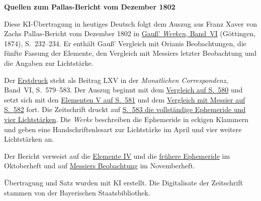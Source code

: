 \clearpage\thispagestyle{empty}
\begin{center}\textbf{Quellen zum Pallas-Bericht vom Dezember 1802}\end{center}
\noindent Diese KI-Übertragung in heutiges Deutsch folgt dem Auszug aus Franz Xaver von Zachs Pallas-Bericht vom Dezember 1802 in \href{https://gdz.sub.uni-goettingen.de/id/PPN236007467}{Gauß’ \textit{Werken}, Band~VI} (Göttingen, 1874), S.~232--234. Er enthält Gauß’ Vergleich mit Orianis Beobachtungen, die fünfte Fassung der Elemente, den Vergleich mit Messiers letzter Beobachtung und die Angaben zur Lichtstärke.
\par\smallskip\noindent Der \href{https://api.digitale-sammlungen.de/iiif/image/v2/bsb10538598_00593/full/1450,/0/default.jpg}{Erstdruck} steht als Beitrag LXV in der \textit{Monatlichen Correspondenz}, Band~VI, S.~579--583. Der Auszug beginnt mit dem \href{https://api.digitale-sammlungen.de/iiif/image/v2/bsb10538598_00594/full/1450,/0/default.jpg}{Vergleich auf S.~580} und setzt sich mit den \href{https://api.digitale-sammlungen.de/iiif/image/v2/bsb10538598_00595/full/1450,/0/default.jpg}{Elementen V auf S.~581} und dem \href{https://api.digitale-sammlungen.de/iiif/image/v2/bsb10538598_00596/full/1450,/0/default.jpg}{Vergleich mit Messier auf S.~582} fort. Die Zeitschrift druckt auf \href{https://api.digitale-sammlungen.de/iiif/image/v2/bsb10538598_00597/full/1450,/0/default.jpg}{S.~583 die vollständige Ephemeride und vier Lichtstärken}. Die \textit{Werke} beschreiben die Ephemeride in eckigen Klammern und geben eine Handschriftenlesart zur Lichtstärke im April und vier weitere Lichtstärken an.
\par\smallskip\noindent Der Bericht verweist auf die \href{https://api.digitale-sammlungen.de/iiif/image/v2/bsb10538598_00404/full/1450,/0/default.jpg}{Elemente IV} und die \href{https://api.digitale-sammlungen.de/iiif/image/v2/bsb10538598_00405/full/1450,/0/default.jpg}{frühere Ephemeride} im Oktoberheft und auf \href{https://api.digitale-sammlungen.de/iiif/image/v2/bsb10538598_00516/full/1450,/0/default.jpg}{Messiers Beobachtung} im Novemberheft.
\par\smallskip\noindent Übertragung und Satz wurden mit KI erstellt. Die Digitalisate der Zeitschrift stammen von der Bayerischen Staatsbibliothek.
\clearpage
